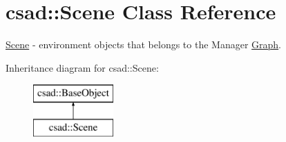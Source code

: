\hypertarget{classcsad_1_1_scene}{\section{csad\-:\-:Scene Class Reference}
\label{classcsad_1_1_scene}
}


\hyperlink{classcsad_1_1_scene}{Scene} -\/ environment objects that belongs to the Manager \hyperlink{classcsad_1_1_graph}{Graph}.  


Inheritance diagram for csad\-:\-:Scene\-:\begin{figure}[H]
\begin{center}
\leavevmode
\includegraphics[height=2.000000cm]{classcsad_1_1_scene}
\end{center}
\end{figure}
